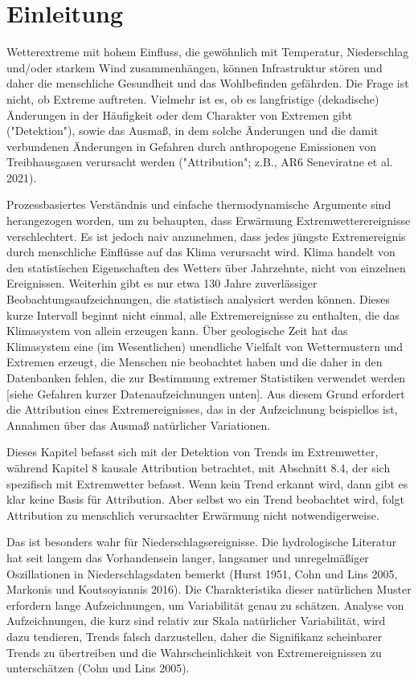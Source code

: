 \documentclass[12pt,paper=a4,DIV=12,parskip=never,chapterprefix=false,headings=standardclasses]{scrreprt}
\begin{document}
\section{Einleitung}
Wetterextreme mit hohem Einfluss, die gewöhnlich mit Temperatur, Niederschlag und/oder starkem Wind zusammenhängen, können Infrastruktur stören und daher die menschliche Gesundheit und das Wohlbefinden gefährden. Die Frage ist nicht, ob Extreme auftreten. Vielmehr ist es, ob es langfristige (dekadische) Änderungen in der Häufigkeit oder dem Charakter von Extremen gibt ("Detektion"), sowie das Ausmaß, in dem solche Änderungen und die damit verbundenen Änderungen in Gefahren durch anthropogene Emissionen von Treibhausgasen verursacht werden ("Attribution"; z.B., AR6 Seneviratne et al. 2021).

Prozessbasiertes Verständnis und einfache thermodynamische Argumente sind herangezogen worden, um zu behaupten, dass Erwärmung Extremwetterereignisse verschlechtert. Es ist jedoch naiv anzunehmen, dass jedes jüngste Extremereignis durch menschliche Einflüsse auf das Klima verursacht wird. Klima handelt von den statistischen Eigenschaften des Wetters über Jahrzehnte, nicht von einzelnen Ereignissen. Weiterhin gibt es nur etwa 130 Jahre zuverlässiger Beobachtungsaufzeichnungen, die statistisch analysiert werden können. Dieses kurze Intervall beginnt nicht einmal, alle Extremereignisse zu enthalten, die das Klimasystem von allein erzeugen kann. Über geologische Zeit hat das Klimasystem eine (im Wesentlichen) unendliche Vielfalt von Wettermustern und Extremen erzeugt, die Menschen nie beobachtet haben und die daher in den Datenbanken fehlen, die zur Bestimmung extremer Statistiken verwendet werden [siehe Gefahren kurzer Datenaufzeichnungen unten]. Aus diesem Grund erfordert die Attribution eines Extremereignisses, das in der Aufzeichnung beispiellos ist, Annahmen über das Ausmaß natürlicher Variationen.

Dieses Kapitel befasst sich mit der Detektion von Trends im Extremwetter, während Kapitel 8 kausale Attribution betrachtet, mit Abschnitt 8.4, der sich spezifisch mit Extremwetter befasst. Wenn kein Trend erkannt wird, dann gibt es klar keine Basis für Attribution. Aber selbst wo ein Trend beobachtet wird, folgt Attribution zu menschlich verursachter Erwärmung nicht notwendigerweise.

Das ist besonders wahr für Niederschlagsereignisse. Die hydrologische Literatur hat seit langem das Vorhandensein langer, langsamer und unregelmäßiger Oszillationen in Niederschlagsdaten bemerkt (Hurst 1951, Cohn und Lins 2005, Markonis und Koutsoyiannis 2016). Die Charakteristika dieser natürlichen Muster erfordern lange Aufzeichnungen, um Variabilität genau zu schätzen. Analyse von Aufzeichnungen, die kurz sind relativ zur Skala natürlicher Variabilität, wird dazu tendieren, Trends falsch darzustellen, daher die Signifikanz scheinbarer Trends zu übertreiben und die Wahrscheinlichkeit von Extremereignissen zu unterschätzen (Cohn und Lins 2005).
\end{document}
